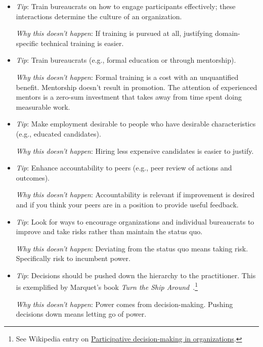 \begin{itemize}
    \item \textit{Tip}: Train bureaucrats on how to engage participants effectively; these interactions determine the culture of an organization. 

    \textit{Why this doesn't happen}: If training is pursued at all, justifying domain-specific technical training is easier. 
    
    \item \textit{Tip}: Train bureaucrats (e.g., formal education or through mentorship).

    \textit{Why this doesn't happen}: Formal training is a cost with an unquantified benefit. Mentorship doesn't result in promotion. The attention of experienced mentors is a zero-sum investment that takes away from time spent doing measurable work.
    
    \item \textit{Tip}: Make employment desirable to people who have desirable characteristics (e.g., educated candidates).

    \textit{Why this doesn't happen}: Hiring less expensive candidates is easier to justify. 
    
    \item \textit{Tip}: Enhance accountability to peers (e.g., peer review of actions and outcomes).

    \textit{Why this doesn't happen}: Accountability is relevant if improvement is desired and if you think your peers are in a position to provide useful feedback. 
    
    \item \textit{Tip}: Look for ways to encourage organizations and individual bureaucrats to improve and take risks rather than maintain the status quo.

    \textit{Why this doesn't happen}: Deviating from the status quo means taking risk. Specifically risk to incumbent power. 
    
    \item \textit{Tip}: Decisions should be pushed down the hierarchy to the practitioner. This is exemplified by Marquet's book \textit{Turn the Ship Around}~\cite{2013_Marquet}.\footnote{See Wikipedia entry on \href{https://en.wikipedia.org/wiki/Participative_decision-making_in_organizations}{Participative decision-making in organizations}.
    }

    \textit{Why this doesn't happen}: Power comes from decision-making. Pushing decisions down means letting go of power.
    

\end{itemize}
